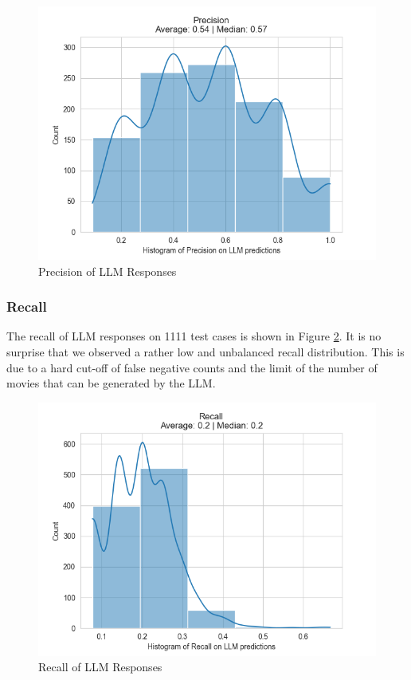 \documentclass[journal]{IEEEtran}
\theoremstyle{mydefstyle}
\begin{document}
\begin{figure}
    \centering
    \includegraphics[width=1\linewidth]{doc//report//assets/llm-precision.png}
    \caption{Precision of LLM Responses}
    \label{fig:llm-precision}
\end{figure}


\subsubsection{Recall}
The recall of LLM responses on 1111 test cases is shown in Figure \ref{fig:llm-recall}. It is no surprise that we observed a rather low and unbalanced recall distribution. This is due to a hard cut-off of false negative counts and the limit of the number of movies that can be generated by the LLM.

\begin{figure}
    \centering
    \includegraphics[width=1\linewidth]{doc//report//assets/llm-recall.png}
    \caption{Recall of LLM Responses}
    \label{fig:llm-recall}
\end{figure}
\end{document}
